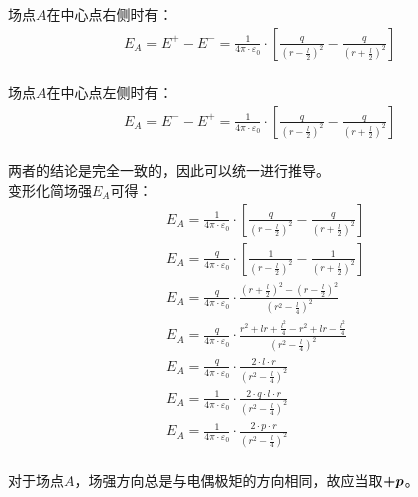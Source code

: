 \documentclass[UTF8]{ctexart}
\newcommand*{\veb}[1]{\vb*{#1}}
\begin{document}
\newpage

    场点$A$在中心点右侧时有：
    \begin{align}
        E_A=E^{+}-E^{-}=\frac{1}{4\pi\cdot\varepsilon_0}\cdot\left[\frac{q}{\left(r-\frac{l}{2}\right)^2}-\frac{q}{\left(r+\frac{l}{2}\right)^2}\right]
    \end{align}\\[1mm]
    场点$A$在中心点左侧时有：
    \begin{align}
        E_A=E^{-}-E^{+}=\frac{1}{4\pi\cdot\varepsilon_0}\cdot\left[\frac{q}{\left(r-\frac{l}{2}\right)^2}-\frac{q}{\left(r+\frac{l}{2}\right)^2}\right]
    \end{align}\\[1mm]
    两者的结论是完全一致的，因此可以统一进行推导。\\[3mm]
    变形化简场强$E_A$可得：
    \begin{align}
        &E_A=\frac{1}{4\pi\cdot\varepsilon_0}\cdot\left[\frac{q}{\left(r-\frac{l}{2}\right)^2}-\frac{q}{\left(r+\frac{l}{2}\right)^2}\right]\\[8mm]
        &E_A=\frac{q}{4\pi\cdot\varepsilon_0}\cdot\left[\frac{1}{\left(r-\frac{l}{2}\right)^2}-\frac{1}{\left(r+\frac{l}{2}\right)^2}\right]\\[8mm]
        &E_A=\frac{q}{4\pi\cdot\varepsilon_0}\cdot\frac{\left(r+\frac{l}{2}\right)^2-\left(r-\frac{l}{2}\right)^2}{\left(r^2-\frac{l}{4}\right)^2}\\[8mm]
        &E_A=\frac{q}{4\pi\cdot\varepsilon_0}\cdot\frac{r^2+lr+\frac{l^2}{4}-r^2+lr-\frac{l^2}{4}}{\left(r^2-\frac{l}{4}\right)^2}\\[8mm]
        &E_A=\frac{q}{4\pi\cdot\varepsilon_0}\cdot\frac{2\cdot l\cdot r}{\left(r^2-\frac{l}{4}\right)^2}\\[8mm]
        &E_A=\frac{1}{4\pi\cdot\varepsilon_0}\cdot\frac{2\cdot q\cdot l\cdot r}{\left(r^2-\frac{l}{4}\right)^2}\\[8mm]
        &E_A=\frac{1}{4\pi\cdot\varepsilon_0}\cdot\frac{2\cdot p\cdot r}{\left(r^2-\frac{l}{4}\right)^2}
    \end{align}\\
    对于场点$A$，场强方向总是与电偶极矩的方向相同，故应当取$\veb{+p}$。

\newpage
\end{document}
